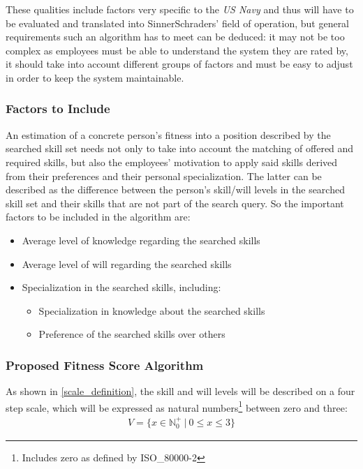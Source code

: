\label{customizable}
These qualities include factors very specific to the \textit{US Navy} and thus will have to be evaluated and translated into SinnerSchraders' field of operation, but general requirements such an algorithm has to meet can be deduced: it may not be too complex as employees must be able to understand the system they are rated by, it should take into account different groups of factors and must be easy to adjust in order to keep the system maintainable.

\subsubsection{Factors to Include}
An estimation of a concrete person's fitness into a position described by the searched skill set needs not only to take into account the matching of offered and required skills, but also the employees' motivation to apply said skills derived from their preferences and their personal specialization. The latter can be described as the difference between the person's skill/will levels in the searched skill set and their skills that are not part of the search query. So the important factors to be included in the algorithm are:
\begin{itemize}
  \item Average level of knowledge regarding the searched skills
  \item Average level of will regarding the searched skills
  \item Specialization in the searched skills, including:
  \begin{itemize}
    \item Specialization in knowledge about the searched skills
    \item Preference of the searched skills over others
  \end{itemize}
\end{itemize}


\subsubsection{Proposed Fitness Score Algorithm}
\label{fitnessscore_impl}
As shown in \ref{scale_definition}, the skill and will levels will be described on a four step scale, which will be expressed as natural numbers\footnote{Includes zero as defined by ISO\_80000-2} between zero and three:
\begin{gather*}
  V = \{ x \in \mathbb{N}_0^+ \ | \  0 \leq x \leq 3\}
\end{gather*}

